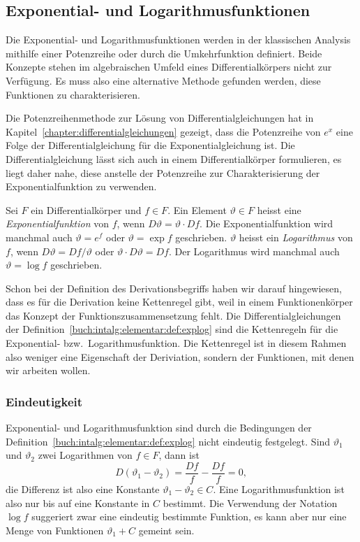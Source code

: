 %
%
\subsection{Exponential- und Logarithmusfunktionen}
Die Exponential- und Logarithmusfunktionen werden in der klassischen
Analysis mithilfe einer Potenzreihe oder durch die Umkehrfunktion
definiert.
Beide Konzepte stehen im algebraischen Umfeld eines Differentialkörpers
nicht zur Verfügung.
Es muss also eine alternative Methode gefunden werden, diese Funktionen
zu charakterisieren.

Die Potenzreihenmethode zur Lösung von Differentialgleichungen
hat in Kapitel~\ref{chapter:differentialgleichungen} gezeigt,
dass die Potenzreihe von $e^x$ eine Folge der Differentialgleichung
für die Exponentialgleichung ist.
Die Differentialgleichung lässt sich auch in einem Differentialkörper
formulieren, es liegt daher nahe, diese anstelle der Potenzreihe
zur Charakterisierung der Exponentialfunktion zu verwenden.

\begin{definition}
\label{buch:intalg:elementar:def:explog}
Sei $F$ ein Differentialkörper und $f\in F$.
Ein Element $\vartheta\in F$ heisst eine \emph{Exponentialfunktion}
von $f$, wenn $D\vartheta = \vartheta\cdot Df$.
%
Die Exponentialfunktion wird manchmal auch $\vartheta=e^f$ oder
$\vartheta=\exp f$ geschrieben.
$\vartheta$ heisst ein \emph{Logarithmus} von $f$, wenn
$D\vartheta = Df/\vartheta$ oder $\vartheta\cdot D\vartheta = Df$.
%
Der Logarithmus wird manchmal auch $\vartheta=\log f$ geschrieben.
\end{definition}

Schon bei der Definition des Derivationsbegriffs haben wir darauf
hingewiesen, dass es für die Derivation keine Kettenregel gibt,
weil in einem Funktionenkörper das Konzept der Funktionszusammensetzung
fehlt.
Die Differentialgleichungen der
Definition~\ref{buch:intalg:elementar:def:explog}
sind die Kettenregeln für die Exponential- bzw.~Logarithmusfunktion.
Die Kettenregel ist in diesem Rahmen also weniger eine Eigenschaft
der Deriviation, sondern der Funktionen, mit denen wir arbeiten wollen.

%
%
\subsubsection{Eindeutigkeit}
Exponential- und Logarithmusfunktion sind durch die Bedingungen der
Definition~\ref{buch:intalg:elementar:def:explog} nicht eindeutig
festgelegt.
Sind $\vartheta_1$ und $\vartheta_2$ zwei Logarithmen von $f\in F$,
dann ist
\[
D(\vartheta_1-\vartheta_2)
=
\frac{Df}{f}-\frac{Df}{f}
=
0,
\]
die Differenz ist also eine Konstante $\vartheta_1-\vartheta_2\in C$.
Eine Logarithmusfunktion ist also nur bis auf eine Konstante in $C$
bestimmt.
Die Verwendung der Notation $\log f$ suggeriert zwar eine eindeutig
bestimmte Funktion, es kann aber nur eine Menge von Funktionen
$\vartheta_1 + C$ gemeint sein.

